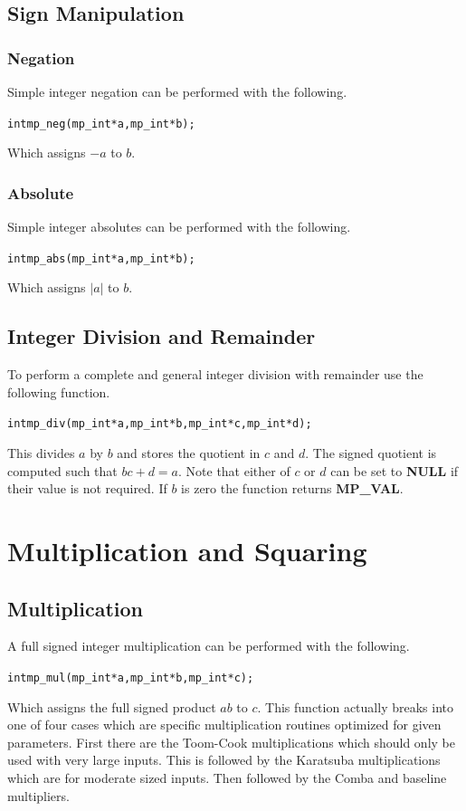 \documentclass[synpaper]{book}
\begin{document}
\section{Sign Manipulation}
\subsection{Negation}
\label{sec:NEG}
Simple integer negation can be performed with the following.

\begin{alltt}
int mp_neg (mp_int * a, mp_int * b);
\end{alltt}

Which assigns $-a$ to $b$.

\subsection{Absolute}
Simple integer absolutes can be performed with the following.

\begin{alltt}
int mp_abs (mp_int * a, mp_int * b);
\end{alltt}

Which assigns $\vert a \vert$ to $b$.

\section{Integer Division and Remainder}
To perform a complete and general integer division with remainder use the following function.

\begin{alltt}
int mp_div (mp_int * a, mp_int * b, mp_int * c, mp_int * d);
\end{alltt}

This divides $a$ by $b$ and stores the quotient in $c$ and $d$.  The signed quotient is computed such that
$bc + d = a$.  Note that either of $c$ or $d$ can be set to \textbf{NULL} if their value is not required.  If
$b$ is zero the function returns \textbf{MP\_VAL}.

\chapter{Multiplication and Squaring}
\section{Multiplication}
A full signed integer multiplication can be performed with the following.
\begin{alltt}
int mp_mul (mp_int * a, mp_int * b, mp_int * c);
\end{alltt}
Which assigns the full signed product $ab$ to $c$.  This function actually breaks into one of four cases which are
specific multiplication routines optimized for given parameters.  First there are the Toom-Cook multiplications which
should only be used with very large inputs.  This is followed by the Karatsuba multiplications which are for moderate
sized inputs.  Then followed by the Comba and baseline multipliers.
\end{document}
